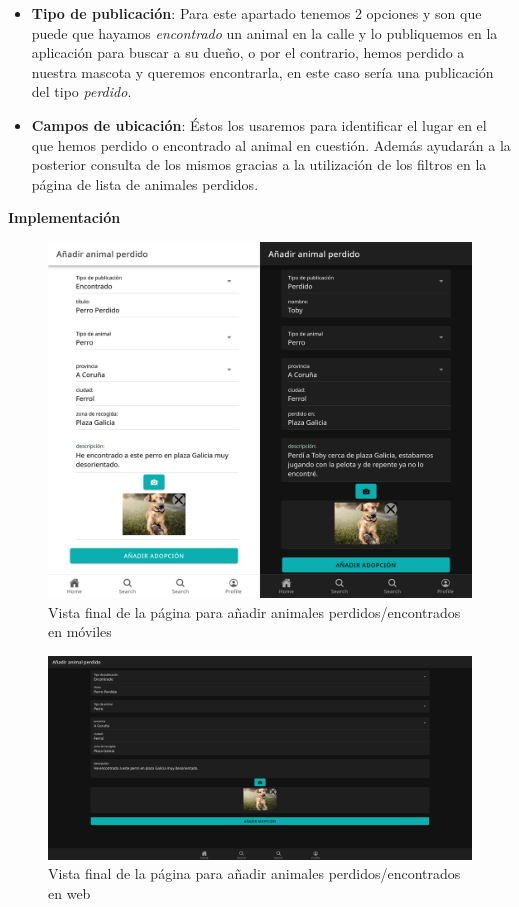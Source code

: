 \begin{itemize}
	\item \textbf{Tipo de publicación}: Para este apartado tenemos 2 opciones y son que puede que hayamos \textit{encontrado} un animal en la calle y lo publiquemos en la aplicación para buscar a su dueño, o por el contrario, hemos perdido a nuestra mascota y queremos encontrarla, en este caso sería una publicación del tipo \textit{perdido}. \\ 
	
	\item \textbf{Campos de ubicación}: Éstos los usaremos para identificar el lugar en el que hemos perdido o encontrado al animal en cuestión. Además ayudarán a la posterior consulta de los mismos gracias a la utilización de los filtros en la página de lista de animales perdidos. \\
	
\end{itemize}

\textbf{Implementación}

\begin{figure}[H]
	\centering
	\includegraphics[width=0.8\linewidth]{"sprint 2/hu4/impPerdidos"}
	\caption{Vista final de la página para añadir animales perdidos/encontrados en móviles}
	\label{fig:impperdidos}
\end{figure}

\begin{figure}[H]
	\centering
	\includegraphics[width=0.8\linewidth]{"sprint 2/hu4/impPerdidosWeb"}
	\caption{Vista final de la página para añadir animales perdidos/encontrados en web}
	\label{fig:impperdidosweb}
\end{figure}

